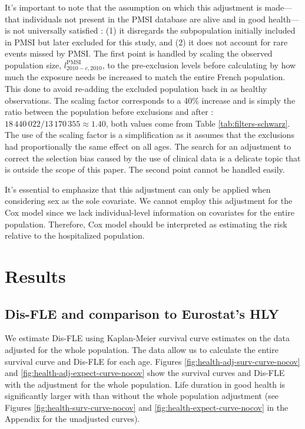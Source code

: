 \documentclass[risks,article,submit,moreauthors,pdftex]{Definitions/mdpi}
\begin{document}
It's important to note that the assumption on which this adjustment is
made---that individuals not present in the PMSI database are alive and
in good health---is not universally satisfied : (1) it disregards the
subpopulation initially included in PMSI but later excluded for this
study, and (2) it does not account for rare events missed by PMSI. The
first point is handled by scaling the observed population size,
\(l_{2010-c,2010}^\text{PMSI}\), to the pre-exclusion levels before
calculating by how much the exposure needs be increased to match the
entire French population. This done to avoid re-adding the excluded
population back in as healthy observations. The scaling factor
corresponds to a 40\% increase and is simply the ratio between the
population before exclusions and after :
\(18\,440\,022 / 13\,170\,355 \approx 1.40\), both values come from
Table \ref{tab:filters-schwarz}. The use of the scaling factor is a
simplification as it assumes that the exclusions had proportionally the
same effect on all ages. The search for an adjustment to correct the
selection bias caused by the use of clinical data is a delicate topic
that is outside the scope of this paper. The second point cannot be
handled easily.

It's essential to emphasize that this adjustment can only be applied
when considering sex as the sole covariate. We cannot employ this
adjustment for the Cox model since we lack individual-level information
on covariates for the entire population. Therefore, Cox model should be
interpreted as estimating the risk relative to the hospitalized
population.

\hypertarget{results}{%
\section{\texorpdfstring{Results
\label{sec:results}}{Results }}\label{results}}

\hypertarget{dis-fle-and-comparison-to-eurostats-hly}{%
\subsection{\texorpdfstring{Dis-FLE and comparison to Eurostat's HLY
\label{sec:hly}}{Dis-FLE and comparison to Eurostat's HLY }}\label{dis-fle-and-comparison-to-eurostats-hly}}

We estimate Dis-FLE using Kaplan-Meier survival curve estimates on the
data adjusted for the whole population. The data allow us to calculate
the entire survival curve and Dis-FLE for each age. Figures
\ref{fig:health-adj-surv-curve-nocov} and
\ref{fig:health-adj-expect-curve-nocov} show the survival curves and
Dis-FLE with the adjustment for the whole population. Life duration in
good health is significantly larger with than without the whole
population adjustment (see Figures \ref{fig:health-surv-curve-nocov} and
\ref{fig:health-expect-curve-nocov} in the Appendix for the unadjusted
curves).
\end{document}

